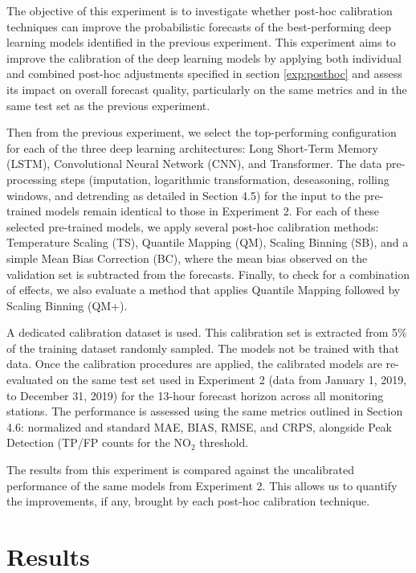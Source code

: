 \documentclass[12pt,a4paper]{book}
\begin{document}
The objective of this experiment is to investigate whether post-hoc calibration techniques can improve the probabilistic forecasts of the best-performing deep learning models identified in the previous experiment. This experiment aims to improve the calibration of the deep learning models by applying both individual and combined post-hoc adjustments specified in section \ref{exp:posthoc} and assess its impact on overall forecast quality, particularly on the same metrics and in the same test set as the previous experiment.

Then from the previous experiment, we select the top-performing configuration for each of the three deep learning architectures: Long Short-Term Memory (LSTM), Convolutional Neural Network (CNN), and Transformer. The data pre-processing steps (imputation, logarithmic transformation, deseasoning, rolling windows, and detrending as detailed in Section 4.5) for the input to the pre-trained models remain identical to those in Experiment 2. For each of these selected pre-trained models, we apply several post-hoc calibration methods: Temperature Scaling (TS), Quantile Mapping (QM), Scaling Binning (SB), and a simple Mean Bias Correction (BC), where the mean bias observed on the validation set is subtracted from the forecasts. Finally, to check for a combination of effects, we also evaluate a method that applies Quantile Mapping followed by Scaling Binning (QM+).

A dedicated calibration dataset is used. This calibration set is extracted from 5\% of the training dataset randomly sampled. The models not be trained with that data. Once the calibration procedures are applied, the calibrated models are re-evaluated on the same test set used in Experiment 2 (data from January 1, 2019, to December 31, 2019) for the 13-hour forecast horizon across all monitoring stations. The performance is assessed using the same metrics outlined in Section 4.6: normalized and standard MAE, BIAS, RMSE, and CRPS, alongside Peak Detection (TP/FP counts for the NO$_2$ threshold. 

The results from this experiment is compared against the uncalibrated performance of the same models from Experiment 2. This allows us to quantify the improvements, if any, brought by each post-hoc calibration technique.

\chapter{Results}
\end{document}
